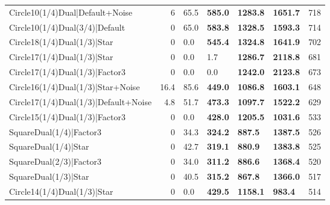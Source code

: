 \begin{tabular}{lrllllr}
 Circle10(1/4)Dual|Default+Noise                                &          6   & 65.5           & \textbf{585.0}  & \textbf{1283.8} & \textbf{1651.7} &          718 \\
 Circle10(1/4)Dual(3/4)|Default                                 &          0   & 65.0           & \textbf{583.8}  & \textbf{1328.5} & \textbf{1593.3} &          714 \\
 Circle18(1/4)Dual(1/3)|Star                                    &          0   & 0.0            & \textbf{545.4}  & \textbf{1324.8} & \textbf{1641.9} &          702 \\
 Circle17(1/4)Dual(1/3)|Star                                    &          0   & 0.0            & 1.7             & \textbf{1286.7} & \textbf{2118.8} &          681 \\
 Circle17(1/4)Dual(1/3)|Factor3                                 &          0   & 0.0            & 0.0             & \textbf{1242.0} & \textbf{2123.8} &          673 \\
 Circle16(1/4)Dual(1/3)|Star+Noise                              &         16.4 & 85.6           & \textbf{449.0}  & \textbf{1086.8} & \textbf{1603.1} &          648 \\
 Circle17(1/4)Dual(1/3)|Default+Noise                           &          4.8 & 51.7           & \textbf{473.3}  & \textbf{1097.7} & \textbf{1522.2} &          629 \\
 Circle15(1/4)Dual(1/3)|Factor3                                 &          0   & 0.0            & \textbf{428.0}  & \textbf{1205.5} & \textbf{1031.6} &          533 \\
 SquareDual(1/4)|Factor3                                        &          0   & 34.3           & \textbf{324.2}  & \textbf{887.5}  & \textbf{1387.5} &          526 \\
 SquareDual(1/4)|Star                                           &          0   & 42.7           & \textbf{319.1}  & \textbf{880.9}  & \textbf{1383.8} &          525 \\
 SquareDual(2/3)|Factor3                                        &          0   & 34.0           & \textbf{311.2}  & \textbf{886.6}  & \textbf{1368.4} &          520 \\
 SquareDual(1/3)|Star                                           &          0   & 40.5           & \textbf{315.2}  & \textbf{867.8}  & \textbf{1366.0} &          517 \\
 Circle14(1/4)Dual(1/3)|Star                                    &          0   & 0.0            & \textbf{429.5}  & \textbf{1158.1} & \textbf{983.4}  &          514 \\

\end{tabular}

